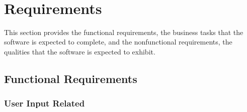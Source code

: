 \documentclass[12pt]{article}
\begin{document}
~\newline
\section{Requirements}

This section provides the functional requirements, the business tasks that the
software is expected to complete, and the nonfunctional requirements, the
qualities that the software is expected to exhibit.

\subsection{Functional Requirements}

\subsubsection{User Input Related}
\end{document}
